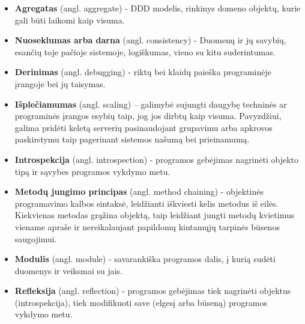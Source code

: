 \begin{itemize}

  \item \textbf{Agregatas} (angl. aggregate) - DDD modelis, rinkinys domeno objektų, kurie gali būti laikomi kaip visuma.

  \item \textbf{Nuoseklumas arba darna} (angl. consistency) - Duomenų ir jų savybių, esančių toje pačioje sistemoje, logiškumas, vieno su kitu suderintumas.

  \item \textbf{Derinimas} (angl. debugging) - riktų bei klaidų paieška programinėje įrangoje bei jų taisymas.

  \item \textbf{Išplečiamumas} (angl. scaling) – galimybė sujungti daugybę techninės ar programinės įrangos esybių taip, jog jos dirbtų kaip visuma. Pavyzdžiui, galima pridėti keletą serverių pasinaudojant grupavimu arba apkrovos paskirstymu taip pagerinant sistemos našumą bei prieinamumą.

  \item \textbf{Introspekcija} (angl. introspection) - programos gebėjimas nagrinėti objekto tipą ir sąvybes programos vykdymo metu.

  \item \textbf{Metodų jungimo principas} (angl. method chaining) - objektinės programavimo kalbos sintaksė, leidžianti iškviesti kelis metodus iš eilės. Kiekvienas metodas grąžina objektą, taip leidžiant jungti metodų kvietimus viename apraše ir nereikalaujant papildomų kintamųjų tarpinės būsenos saugojimui.

  \item \textbf{Modulis} (angl. module) - savarankiška programos dalis, į kurią sudėti duomenys ir veiksmai su jais.

  \item \textbf{Refleksija} (angl. reflection) - programos gebėjimas tiek nagrinėti objektus (introspekcija), tiek modifikuoti save (elgesį arba būseną) programos vykdymo metu.

\end{itemize}
